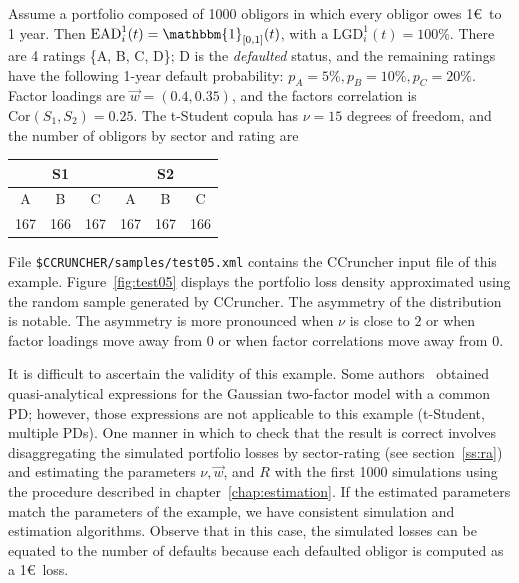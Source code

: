 \documentclass[11pt,fleqn]{book} %
\begin{document}
\begin{example}[2 factors]
	\label{ex:test05}
	Assume a portfolio composed of \num{1000} obligors in which every obligor 
	owes 1\euro\ to 1 year. Then $\text{EAD}_i^1(t) = \mathbbm{1}_{[0,1]}(t)$, 
	with a $\text{LGD}_i^1(t)=100\%$. There are 4 ratings \{A, B, C, D\}; D is 
	the \emph{defaulted} status, and the remaining ratings have the following 
	1-year default probability: $p_A = 5\%, p_B = 10\%, p_C = 20\%$. Factor 
	loadings are $\vec{w} = (0.4, 0.35)$, and the factors correlation is 
	$\text{Cor}(S_1,S_2) = 0.25$. The t-Student copula has $\nu=15$ degrees
	of freedom, and the number of obligors by sector and rating are

	\hspace*{1cm}
	\begin{tabular}{|c|c|c||c|c|c|}
		\hline
		\multicolumn{3}{|c||}{S1} & \multicolumn{3}{|c|}{S2} \\
		\hline
		A & B & C & A & B & C \\
		\hline
		167 & 166 & 167 & 167 & 167 & 166 \\
		\hline
	\end{tabular}

	File \texttt{\$CCRUNCHER/samples/test05.xml} contains the CCruncher input
	file of this example. Figure~\ref{fig:test05} displays the portfolio
	loss density approximated using the random sample generated by CCruncher.
	The asymmetry of the distribution is notable. The asymmetry is more 
	pronounced when $\nu$ is close to $2$ or when factor loadings move away 
	from $0$ or when factor correlations move away from $0$.

	It is difficult to ascertain the validity of this example. Some 
	authors~\cite{cespedes:2002} obtained quasi-analytical expressions for 
	the Gaussian two-factor model with a common PD; however, those expressions 
	are not applicable to this example (t-Student, multiple PDs). One manner in 
	which to check that the result is correct involves disaggregating the 
	simulated portfolio losses by sector-rating (see section~\ref{ss:ra}) and 
	estimating the parameters $\nu, \vec{w}$, and $R$ with the first \num{1000} 
	simulations using the procedure described in chapter~\ref{chap:estimation}. 
	If the estimated parameters match the parameters of the example, we have
	consistent simulation and estimation algorithms. Observe that in 
	this case, the simulated losses can be equated to the number of defaults 
	because each defaulted obligor is computed as a 1\euro\ loss.
\end{example}
\end{document}
